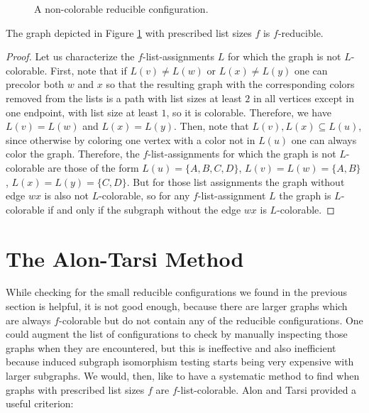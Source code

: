 \begin{figure}

\centering
\begin{tikzpicture}

\end{tikzpicture}
\caption{A non-colorable reducible configuration.}
\label{fig:noncolorablereducible}
\end{figure}

\begin{observation}
The graph depicted in Figure \ref{fig:noncolorablereducible} with prescribed list sizes $f$ is $f$-reducible.
\end{observation}

\begin{proof}
Let us characterize the $f$-list-assignments $L$ for which the graph is not $L$-colorable. First, note that if $L(v) \neq L(w)$ or $L(x) \neq L(y)$
one can precolor both $w$ and $x$ so that the resulting graph with the corresponding colors removed from the lists is a path with list sizes at least $2$
in all vertices except in one endpoint, with list size at least $1$, so it is colorable. Therefore, we have $L(v) = L(w)$ and $L(x) = L(y)$. Then, note
that $L(v), L(x) \subseteq L(u)$, since otherwise by coloring one vertex with a color not in $L(u)$ one can always color the graph. Therefore, the $f$-list-assignments
for which the graph is not $L$-colorable are those of the form $L(u) = \{A, B, C, D\}$, $L(v) = L(w) = \{A, B\}$, $L(x) = L(y) = \{C, D\}$. But for those list assignments
the graph without edge $wx$ is also not $L$-colorable, so for any $f$-list-assignment $L$ the graph is $L$-colorable if and only if the subgraph without the edge $wx$ is
$L$-colorable.
\end{proof}

\section{The Alon-Tarsi Method}

While checking for the small reducible configurations we found in the previous section is helpful, it is not good enough, because
there are larger graphs which are always $f$-colorable but do not contain any of the reducible configurations. One could augment the
list of configurations to check by manually inspecting
those graphs when they are encountered, but this is ineffective and also inefficient because
induced subgraph isomorphism testing starts being very expensive with larger subgraphs. 
We would, then, like to have a systematic method to find when graphs with prescribed list sizes $f$ are $f$-list-colorable. Alon and Tarsi
provided a useful criterion:

